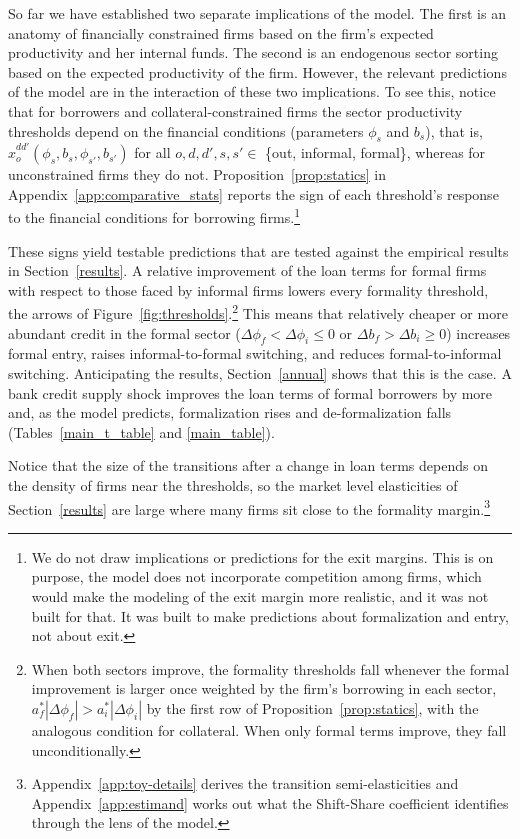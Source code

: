 \documentclass[12pt]{article}
\begin{document}
So far we have established two separate implications of the model. The first is an anatomy of financially constrained firms based on the firm's expected productivity and her internal funds. The second is an endogenous sector sorting based on the expected productivity of the firm. However, the relevant predictions of the model are in the interaction of these two implications. To see this, notice that for borrowers and collateral-constrained firms the sector productivity thresholds depend on the financial conditions (parameters $\phi_s$ and $b_s$), that is, $\hat x_o^{dd'}(\phi_s,b_s,\phi_{s'},b_{s'})$ for all $o,d,d',s,s' \in$ \{out, informal, formal\}, whereas for unconstrained firms they do not. Proposition~\ref{prop:statics} in Appendix~\ref{app:comparative_stats} reports the sign of each threshold's response to the financial conditions for borrowing firms.\footnote{We do not draw implications or predictions for the exit margins. This is on purpose, the model does not incorporate competition among firms, which would make the modeling of the exit margin more realistic, and it was not built for that. It was built to make predictions about formalization and entry, not about exit.}

These signs yield testable predictions that are tested against the empirical results in Section~\ref{results}. A relative improvement of the loan terms for formal firms with respect to those faced by informal firms lowers every formality threshold, the arrows of Figure~\ref{fig:thresholds}.\footnote{When both sectors improve, the formality thresholds fall whenever the formal improvement is larger once weighted by the firm's borrowing in each sector, $a^{*}_{f}|\Delta\phi_{f}|>a^{*}_{i}|\Delta\phi_{i}|$ by the first row of Proposition~\ref{prop:statics}, with the analogous condition for collateral. When only formal terms improve, they fall unconditionally.} This means that relatively cheaper or more abundant credit in the formal sector ($\Delta \phi_{f} < \Delta \phi_{i} \leq 0$ or $\Delta b_{f} > \Delta b_{i} \geq 0$) increases formal entry, raises informal-to-formal switching, and reduces formal-to-informal switching. Anticipating the results, Section~\ref{annual} shows that this is the case. A bank credit supply shock improves the loan terms of formal borrowers by more and, as the model predicts, formalization rises and de-formalization falls (Tables~\ref{main_t_table} and \ref{main_table}).

Notice that the size of the transitions after a change in loan terms depends on the density of firms near the thresholds, so the market level elasticities of Section~\ref{results} are large where many firms sit close to the formality margin.\footnote{Appendix~\ref{app:toy-details} derives the transition semi-elasticities and Appendix~\ref{app:estimand} works out what the Shift-Share coefficient identifies through the lens of the model.}
\end{document}
